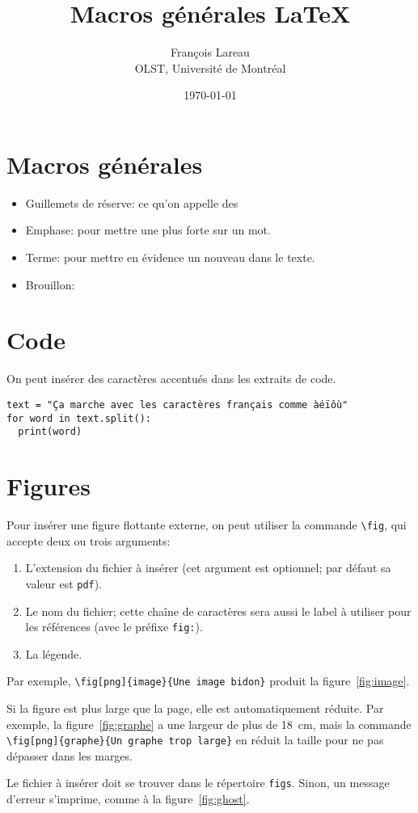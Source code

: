 \documentclass{article}
\title{Macros générales \LaTeX}
\author{François Lareau\\OLST, Université de Montréal}
\date{\today}
\begin{document}
\maketitle

\section{Macros générales}

\begin{itemize}
	\item Guillemets de réserve: ce qu'on appelle des 
	\item Emphase: pour mettre une plus forte  sur un mot.
	\item Terme: pour mettre en évidence un nouveau  dans le texte.
	\item Brouillon: 
\end{itemize}


\section{Code}

On peut insérer des caractères accentués dans les extraits de code.

\begin{lstlisting}
text = "Ça marche avec les caractères français comme àéïôù"
for word in text.split():
  print(word)
\end{lstlisting}


\section{Figures}

Pour insérer une figure flottante externe, on peut utiliser la commande \lstinline{\fig}, qui accepte deux ou trois arguments:

\begin{enumerate}
	\item L'extension du fichier à insérer (cet argument est optionnel; par défaut sa valeur est \lstinline{pdf}).
	\item Le nom du fichier; cette chaîne de caractères sera aussi le label à utiliser pour les références (avec le préfixe \lstinline{fig:}).
	\item La légende.
\end{enumerate}

Par exemple, \lstinline|\fig[png]{image}{Une image bidon}| produit la figure~\ref{fig:image}.


Si la figure est plus large que la page, elle est automatiquement réduite. Par exemple, la figure~\ref{fig:graphe} a une largeur de plus de 18~cm, mais la commande \lstinline|\fig[png]{graphe}{Un graphe trop large}| en réduit la taille pour ne pas dépasser dans les marges.


Le fichier à insérer doit se trouver dans le répertoire \lstinline{figs}. Sinon, un message d'erreur s'imprime, comme à la figure~\ref{fig:ghost}.

\end{document}

